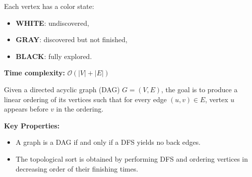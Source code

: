 \documentclass[a4paper,landscape]{article}
\begin{document}
\begin{multicols}{7}
Each vertex has a color state:
\begin{itemize}[noitemsep, topsep=0pt]
    \item \textbf{WHITE}: undiscovered,
    \item \textbf{GRAY}: discovered but not finished,
    \item \textbf{BLACK}: fully explored.
\end{itemize}

\noindent %
\textbf{Time complexity:} $\mathcal{O}(|V| + |E|)$ \quad
\endtcolorbox

\tcolorbox[mybox={Topological Sort}]
Given a directed acyclic graph (DAG) $G = (V, E)$, the goal is to produce a linear ordering of its vertices such that for every edge $(u, v) \in E$, vertex $u$ appears before $v$ in the ordering.

\textbf{Key Properties:}
\begin{itemize}[noitemsep, topsep=0pt]
    \item A graph is a DAG if and only if a DFS yields no back edges.
    \item The topological sort is obtained by performing DFS and ordering vertices in decreasing order of their finishing times.
\end{itemize}


\end{multicols}
\end{document}
